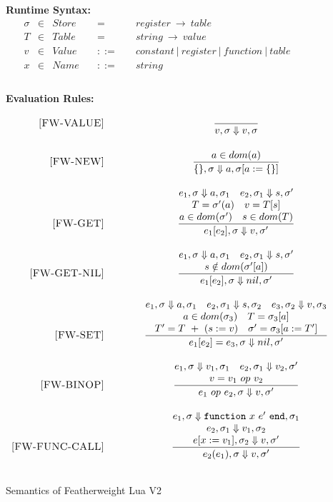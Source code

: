 \documentclass{article}
\begin{document}
\begin{figure}[P]
\caption{Semantics of Featherweight Lua V2}
{\bf Runtime Syntax:}
\label{fig:FW2Sem}
\[
\begin{array}{rclcl}
  \sigma & \in & {Store} \quad  & = & \quad {register} ~\rightarrow ~{table} \\
  T & \in & {Table} \quad  & = & \quad {string} ~\rightarrow ~{value} \\
  v & \in & {Value} \quad & ::= & \quad constant~|~ register ~|~ function~|~table \\
  x & \in & {Name} \quad & ::= & \quad string \\
  \\
\end{array}
\]

{\bf Evaluation Rules:~~~ } \\
\[
\begin{array}{r@{\qquad\qquad}c}
\ssrule{FW-VALUE}{
}{
  \semanticFull {v}{\sigma} {v}{\sigma}
}
\ssrule{FW-NEW}{
  a \in dom(a)
}{
  \semanticFull{\{\}}{\sigma}{a}{\sigma[a := \{\}]}
}
\ssrule{FW-GET}{
  \semanticFull{e_1}{\sigma}{a}{\sigma_1} \quad
  \semanticFull{e_2}{\sigma_1}{s}{\sigma'} \\
  T = \sigma'(a)\quad
  v = T[s]\\
  a \in dom(\sigma') \quad
  s \in dom(T)\\
  
}{
  \semanticFull{e_1[e_2]}{\sigma}{v}{\sigma'}
}
\ssrule{FW-GET-NIL}{
  \semanticFull{e_1}{\sigma}{a}{\sigma_1} \quad
  \semanticFull{e_2}{\sigma_1}{s}{\sigma'} \\
  s \notin dom(\sigma'[a]) 
}{
  \semanticFull{e_1[e_2]}{\sigma}{nil}{\sigma'}
}
\ssrule{FW-SET}{
  \semanticFull{e_1}{\sigma}{a}{\sigma_1} \quad
  \semanticFull{e_2}{\sigma_1}{s}{\sigma_2} \quad
  \semanticFull{e_3}{\sigma_2}{v}{\sigma_3} \\
  a \in dom({\sigma}_3) \quad
  T = \sigma_3[a]\\
  T' = T~+~(s := v)\quad
  \sigma' = \sigma_3[a:=T']
}{
  \semanticFull{e_1[e_2] = e_3}{\sigma}{nil}{\sigma'}
}
\ssrule{FW-BINOP}{
  \semanticFull{e_1}{\sigma}{v_1}{\sigma_1} \quad
  \semanticFull{e_2}{\sigma_1}{v_2}{\sigma'} \\
  v = v_1 ~op~ v_2
}{
  \semanticFull{e_1 ~op~ e_2}{\sigma}{v}{\sigma'}
}
\ssrule{FW-FUNC-CALL}{
  \semanticFull{e_1}{\sigma}{{\tt function} ~x ~e' ~{\tt end}}{\sigma_1} \\
  \semanticFull{e_2}{\sigma_1}{v_1}{\sigma_2} \\
  \semanticFull{e[x:=v_1]}{\sigma_2}{v}{\sigma'} 
}{
  \semanticFull{e_2(e_1)}{\sigma}{v}{\sigma'} 
}
\end{array}
\]
\end{figure}
\end{document}
